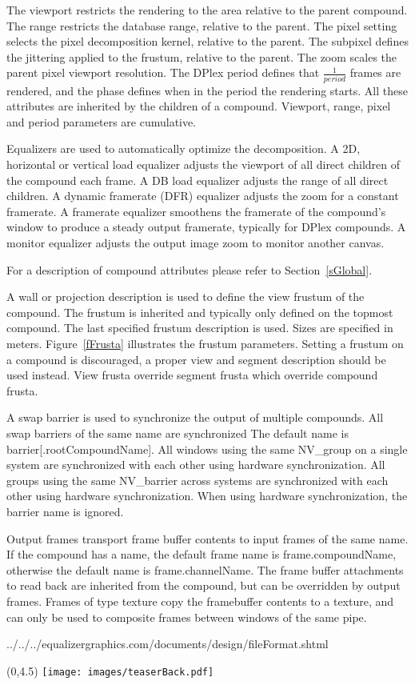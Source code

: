 \documentclass[10pt,a4]{scrartcl}
\newcommand{\fig}[1]{Figure~\ref{#1}}
\newcommand{\sref}[1]{Section~\ref{#1}}
\begin{document}
The viewport restricts the rendering to the area relative to the parent
compound. The range restricts the database range, relative to the
parent. The pixel setting selects the pixel decomposition kernel,
relative to the parent. The subpixel defines the jittering applied to
the frustum, relative to the parent. The zoom scales the parent
pixel viewport resolution. The DPlex period defines that $\frac{1}{period}$
frames are rendered, and the phase defines when in the period the
rendering starts. All these attributes are inherited by the children of
a compound. Viewport, range, pixel and period parameters are cumulative.

Equalizers are used to automatically optimize the decomposition. A 2D,
horizontal or vertical load equalizer adjusts the viewport of all direct
children of the compound each frame. A DB load equalizer adjusts the
range of all direct children. A dynamic framerate (DFR) equalizer adjusts
the zoom for a constant framerate. A framerate equalizer
smoothens the framerate of the compound's window to produce a steady
output framerate, typically for DPlex compounds. A monitor equalizer
adjusts the output image zoom to monitor another canvas.

For a description of compound attributes please refer to \sref{sGlobal}.

A wall or projection description is used to define the view frustum of
the compound. The frustum is inherited and typically only defined on the
topmost compound. The last specified frustum description is used. Sizes
are specified in meters. \fig{fFrusta} illustrates the frustum
parameters. Setting a frustum on a compound is discouraged, a proper view and
segment description should be used instead. View frusta override segment frusta
which override compound frusta.

A swap barrier is used to synchronize the output of multiple
compounds. All swap barriers of the same name are synchronized The
default name is \textsf{barrier[.root\-Com\-pound\-Name]}. All windows
using the same \textsf{NV\_group} on a single system are synchronized
with each other using hardware synchronization. All groups using the
same \textsf{NV\_barrier} across systems are synchronized with each
other using hardware synchronization. When using hardware
synchronization, the barrier name is ignored.

Output frames transport frame buffer contents to input frames of the
same name. If the compound has a name, the default frame name is
\textsf{frame.compoundName}, otherwise the default name is
\textsf{frame.channelName}. The frame buffer attachments to read back
are inherited from the compound, but can be overridden by output
frames. Frames of type \textsf{texture} copy the framebuffer contents to
a texture, and can only be used to composite frames between windows of
the same pipe.

{\footnotesize
  {../../../equalizergraphics.com/documents/design/fileFormat.shtml}}

\cleardoublepage
\pagestyle{empty}
\begin{textblock}{}(0,4.5)
  \hspace{-1cm}\texttt{[image: images/teaserBack.pdf]}
\end{textblock}
\end{document}
